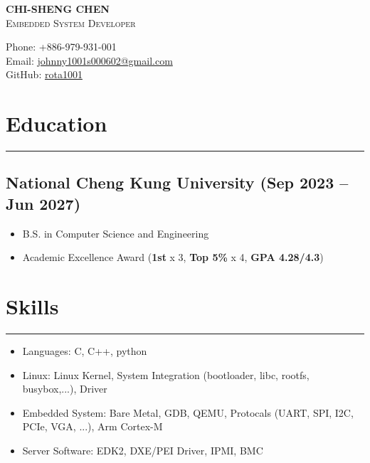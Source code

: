 \documentclass[11pt]{article}
\begin{document}
\noindent
\begin{minipage}[t]{0.62\linewidth}
  {\LARGE\bfseries CHI-SHENG CHEN}\\[3pt]
  {\small\scshape Embedded System Developer}
\end{minipage}%
\hfill
\begin{minipage}[t]{0.36\linewidth}
  \raggedright
  {\footnotesize Phone: +886-979-931-001}\\[1pt]
  {\footnotesize Email: \href{mailto:johnny1001s000602@gmail.com}{johnny1001s000602@gmail.com}}\\[1pt]
  {\footnotesize GitHub: \href{https://github.com/rota1001}{rota1001}}
\end{minipage}

\section*{Education}
\vspace{-9pt}\noindent\rule{\linewidth}{0.6pt}\vspace{-1pt}
\subsection*{National Cheng Kung University (Sep 2023 -- Jun 2027)}
\begin{itemize}
  \item B.S. in Computer Science and Engineering
  \item Academic Excellence Award (\textbf{1st} x 3, \textbf{Top 5\%} x 4, \textbf{GPA 4.28/4.3})
\end{itemize}

\section*{Skills}
\vspace{-9pt}\noindent\rule{\linewidth}{0.6pt}\vspace{-1pt}
\begin{itemize}
  \item Languages: C, C++, python
  \item Linux: Linux Kernel, System Integration (bootloader, libc, rootfs, busybox,...), Driver
  \item Embedded System: Bare Metal, GDB, QEMU, Protocals (UART, SPI, I2C, PCIe, VGA, ...), Arm Cortex-M
  \item Server Software: EDK2, DXE/PEI Driver, IPMI, BMC
\end{itemize}
\end{document}

